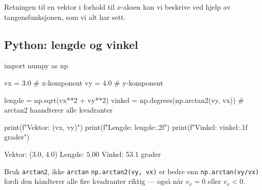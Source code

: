 Retningen til en vektor i forhold til $x$-aksen kan vi beskrive ved hjelp av tangensfunksjonen, som vi alt har sett. 



\subsection*{Python: lengde og vinkel}

\begin{pythonkode}
import numpy as np

vx = 3.0    # x-komponent
vy = 4.0    # y-komponent

lengde = np.sqrt(vx**2 + vy**2)
vinkel = np.degrees(np.arctan2(vy, vx))  # arctan2 haandterer alle kvadranter

print(f"Vektor:  ({vx}, {vy})")
print(f"Lengde:  {lengde:.2f}")
print(f"Vinkel:  {vinkel:.1f} grader")
\end{pythonkode}
\begin{pythonoutput}
Vektor:  (3.0, 4.0)
Lengde:  5.00
Vinkel:  53.1 grader
\end{pythonoutput}

\begin{mymerk*}{Bruk \texttt{arctan2}, ikke \texttt{arctan}}
\texttt{np.arctan2(vy, vx)} er bedre enn \texttt{np.arctan(vy/vx)} fordi den håndterer alle fire kvadranter riktig — også når $v_x = 0$ eller $v_x < 0$.
\end{mymerk*}

